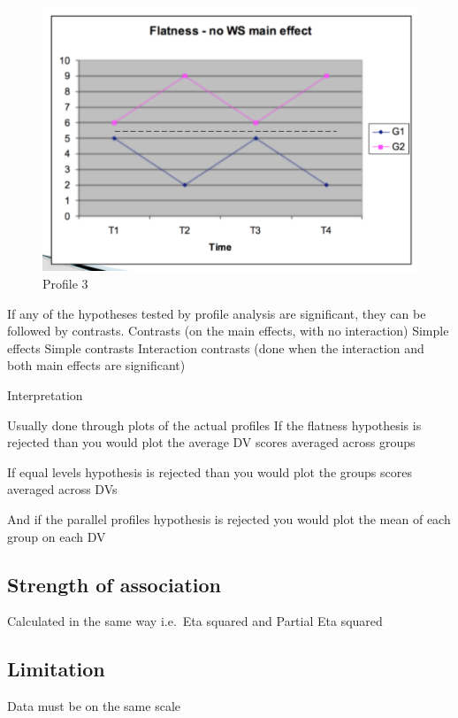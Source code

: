 \documentclass[]{book}
\theoremstyle{definition}
\theoremstyle{definition}
\theoremstyle{definition}
\theoremstyle{remark}
\begin{document}
{\begin{figure}
\centering
\includegraphics{img/jhprofile4.png}
\caption{Profile 3}
\end{figure}

If any of the hypotheses tested by profile analysis are significant,
they can be followed by contrasts. Contrasts (on the main effects, with
no interaction) Simple effects Simple contrasts Interaction contrasts
(done when the interaction and both main effects are significant)

Interpretation

Usually done through plots of the actual profiles If the flatness
hypothesis is rejected than you would plot the average DV scores
averaged across groups

If equal levels hypothesis is rejected than you would plot the groups
scores averaged across DVs

And if the parallel profiles hypothesis is rejected you would plot the
mean of each group on each DV

\subsection{Strength of association}\label{strength-of-association}

Calculated in the same way i.e.~Eta squared and Partial Eta squared

\subsection{Limitation}\label{limitation}

Data must be on the same scale

}
\end{document}
